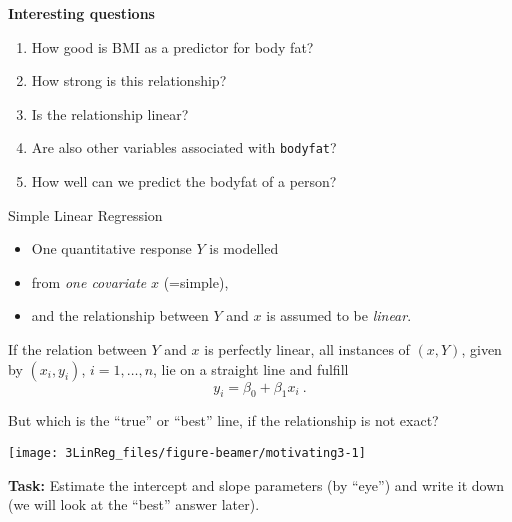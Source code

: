 \documentclass[10pt,ignorenonframetext,]{beamer}
\providecommand{\tightlist}{%
  \setlength{\itemsep}{0pt}\setlength{\parskip}{0pt}}
\begin{document}
\begin{frame}[fragile]

\textbf{Interesting questions}

\begin{enumerate}
\tightlist
\item
  How good is BMI as a predictor for body fat?
\item
  How strong is this relationship?
\item
  Is the relationship linear?
\item
  Are also other variables associated with \texttt{bodyfat}?
\item
  How well can we predict the bodyfat of a person?
\end{enumerate}

\end{frame}

\begin{frame}{Simple Linear Regression}
\protect\hypertarget{simple-linear-regression}{}

\begin{itemize}
\item
  One quantitative response \(Y\) is modelled
\item
  from \emph{one covariate} \(x\) (=simple),
\item
  and the relationship between \(Y\) and \(x\) is assumed to be
  \emph{linear}.
\end{itemize}

\vspace{6mm}

If the relation between \(Y\) and \(x\) is perfectly linear, all
instances of \((x,Y)\), given by \((x_i,y_i)\), \(i= 1,\ldots, n\), lie
on a straight line and fulfill \[y_i = \beta_0 + \beta_1 x_i\ .\]

\end{frame}

\begin{frame}

But which is the ``true'' or ``best'' line, if the relationship is not
exact?

\begin{center}\texttt{[image: 3LinReg\_files/figure-beamer/motivating3-1]} \end{center}

\textbf{Task:} Estimate the intercept and slope parameters (by ``eye'')
and write it down (we will look at the ``best'' answer later).

\end{frame}
\end{document}
